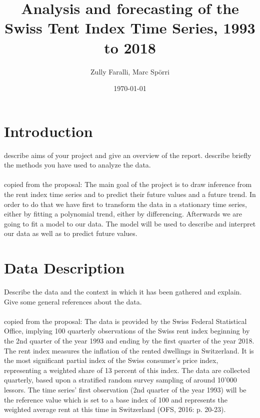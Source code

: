 \documentclass[11pt,a4paper]{article}
\author{Zully Faralli, Marc Spörri} \title{Analysis and forecasting of the Swiss Tent Index Time Series, 1993 to 2018} \date{\today}
\begin{document}
\maketitle


\section{Introduction}
describe aims of your project and give an overview of the report. describe briefly the methods you have used to analyze the data.
\\
\\
copied from the proposal: The main goal of the project is to draw inference from the rent index time series and to predict their
future values and a future trend. In order to do that we have first to transform the data in a
stationary time series, either by fitting a polynomial trend, either by differencing. Afterwards we are
going to fit a model to our data. The model will be used to describe and interpret our data as well as
to predict future values.

\section{Data Description}
Describe the data and the context in which it has been gathered and explain. Give some general references about the data.
\\
\\
copied from the proposal: The data is provided by the Swiss Federal Statistical Office, implying 100 quarterly observations of
the Swiss rent index beginning by the 2nd quarter of the year 1993 and ending by the first quarter of
the year 2018. The rent index measures the inflation of the rented dwellings in Switzerland. It is the
most significant partial index of the Swiss consumer’s price index, representing a weighted share of
13 percent of this index. The data are collected quarterly, based upon a stratified random survey sampling
of around 10'000 lessors. The time series’ first observation (2nd quarter of the year 1993) will be the
reference value which is set to a base index of 100 and represents the weighted average rent at this
time in Switzerland (OFS, 2016: p. 20-23).
\end{document}
